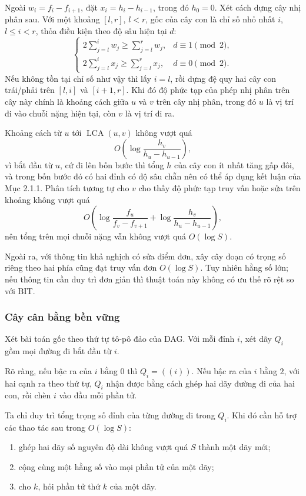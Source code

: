 \documentclass[11pt]{article}
\begin{document}
Ngoài \(w_i=f_i-f_{i+1}\), đặt \(x_i=h_i-h_{i-1}\), trong đó \(h_0=0\). Xét
cách dựng cây nhị phân sau. Với một khoảng \([l,r]\), \(l<r\), gốc của cây con
là chỉ số nhỏ nhất \(i\), \(l\le i<r\), thỏa điều kiện theo độ sâu hiện tại
\(d\):
\[
\begin{cases}
2\sum_{j=l}^i w_j \ge \sum_{j=l}^r w_j, & d\equiv 1 \pmod 2,\\[0.3em]
2\sum_{j=l}^i x_j \ge \sum_{j=l}^r x_j, & d\equiv 0 \pmod 2.
\end{cases}
\]
Nếu không tồn tại chỉ số như vậy thì lấy \(i=l\), rồi dựng đệ quy hai cây con
trái/phải trên \([l,i]\) và \([i+1,r]\). Khi đó độ phức tạp của phép nhị phân
trên cây này chính là khoảng cách giữa \(u\) và \(v\) trên cây nhị phân, trong
đó \(u\) là vị trí đi vào chuỗi nặng hiện tại, còn \(v\) là vị trí đi ra.

Khoảng cách từ \(u\) tới \(\operatorname{LCA}(u,v)\) không vượt quá
\[
O\!\left(\log\frac{h_v}{h_u-h_{u-1}}\right),
\]
vì bắt đầu từ \(u\), cứ đi lên bốn bước thì tổng \(h\) của cây con ít nhất tăng
gấp đôi, và trong bốn bước đó có hai đỉnh có độ sâu chẵn nên có thể áp dụng kết
luận của Mục 2.1.1. Phân tích tương tự cho \(v\) cho thấy độ phức tạp truy vấn
hoặc sửa trên khoảng không vượt quá
\[
O\!\left(\log\frac{f_u}{f_v-f_{v+1}}+
        \log\frac{h_v}{h_u-h_{u-1}}\right),
\]
nên tổng trên mọi chuỗi nặng vẫn không vượt quá \(O(\log S)\).

Ngoài ra, với thông tin khả nghịch có sửa điểm đơn, xây cây đoạn có trọng số
riêng theo hai phía cũng đạt truy vấn đơn $O(\log S)$. Tuy nhiên hằng số lớn; nếu
thông tin cần duy trì đơn giản thì thuật toán này không có ưu thế rõ rệt so với
BIT.

\subsubsection{Cây cân bằng bền vững}

Xét bài toán gốc theo thứ tự tô-pô đảo của DAG. Với mỗi đỉnh $i$, xét dãy $Q_i$
gồm mọi đường đi bắt đầu từ $i$.

Rõ ràng, nếu bậc ra của $i$ bằng $0$ thì $Q_i=((i))$. Nếu bậc ra của $i$ bằng
$2$, với hai cạnh ra theo thứ tự, $Q_i$ nhận được bằng cách ghép hai dãy đường
đi của hai con, rồi chèn $i$ vào đầu mỗi phần tử.

Ta chỉ duy trì tổng trọng số đỉnh của từng đường đi trong $Q_i$. Khi đó cần hỗ
trợ các thao tác sau trong $O(\log S)$:
\begin{enumerate}
  \item ghép hai dãy số nguyên độ dài không vượt quá $S$ thành một dãy mới;
  \item cộng cùng một hằng số vào mọi phần tử của một dãy;
  \item cho $k$, hỏi phần tử thứ $k$ của một dãy.
\end{enumerate}
\end{document}
